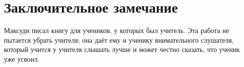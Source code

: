 \section{Заключительное замечание}

Максуди писал книгу для учеников, у которых был учитель. Эта работа не пытается убрать учителя; она даёт ему
и ученику внимательного слушателя, который учится у учителя слышать лучше и может честно сказать, что ученик
уже усвоил.
